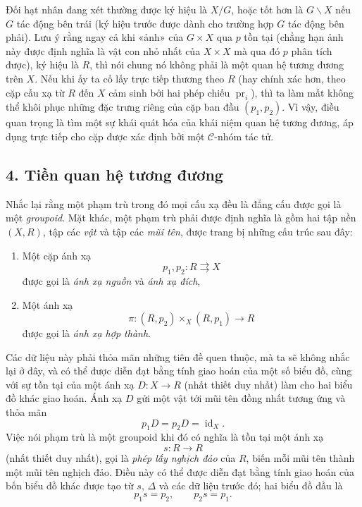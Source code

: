 Đối hạt nhân đang xét thường được ký hiệu là $X/G$, hoặc tốt hơn là
$G\backslash X$ nếu $G$ tác động bên trái (ký hiệu trước được dành cho trường
hợp $G$ tác động bên phải). Lưu ý rằng ngay cả khi «ảnh» của $G\times X$ qua
$p$ tồn tại (chẳng hạn ảnh này được định nghĩa là vật con nhỏ nhất của
$X\times X$ mà qua đó $p$ phân tích được), ký hiệu là $R$, thì nói chung nó
không phải là một quan hệ tương đương trên $X$. Nếu khi ấy ta cố lấy trực tiếp
thương theo $R$ (hay chính xác hơn, theo cặp cấu xạ từ $R$ đến $X$ cảm sinh bởi
hai phép chiếu $\operatorname{pr}_i$), thì ta làm mất không thể khôi phục
những đặc trưng riêng của cặp ban đầu $(p_1,p_2)$. Vì vậy, điều quan trọng là
tìm một sự khái quát hóa của khái niệm quan hệ tương đương, áp dụng trực tiếp
cho cặp được xác định bởi một $\mathcal C$-nhóm tác tử.

\subsection*{4. Tiền quan hệ tương đương}

Nhắc lại rằng một phạm trù trong đó mọi cấu xạ đều là đẳng cấu được gọi là một
\emph{groupoid}. Mặt khác, một phạm trù phải được định nghĩa là gồm hai tập nền
$(X,R)$, tập các \emph{vật} và tập các \emph{mũi tên}, được trang bị những cấu
trúc sau đây:
\begin{enumerate}
\item[(i)] Một cặp ánh xạ
\[
  p_1,p_2:R\rightrightarrows X
\]
được gọi là \emph{ánh xạ nguồn} và \emph{ánh xạ đích},

\item[(ii)] Một ánh xạ
\[
  \pi:(R,p_2)\times_X(R,p_1)\longrightarrow R
\]
được gọi là \emph{ánh xạ hợp thành}.
\end{enumerate}
Các dữ liệu này phải thỏa mãn những tiên đề quen thuộc, mà ta sẽ không nhắc
lại ở đây, và có thể được diễn đạt bằng tính giao hoán của một số biểu đồ,
cùng với sự tồn tại của một ánh xạ $D:X\to R$ (nhất thiết duy nhất) làm cho
hai biểu đồ khác giao hoán. Ánh xạ $D$ gửi một vật tới mũi tên đồng nhất tương ứng
và thỏa mãn
\[
  p_1D=p_2D=\operatorname{id}_X.
\]
Việc nói phạm trù là một groupoid khi đó có nghĩa là tồn tại một ánh xạ
\[
  s:R\longrightarrow R
\]
(nhất thiết duy nhất), gọi là \emph{phép lấy nghịch đảo} của $R$, biến mỗi
mũi tên thành một mũi tên nghịch đảo. Điều này có thể được diễn đạt bằng tính
giao hoán của bốn biểu đồ khác được tạo từ $s$, $\Delta$ và các dữ liệu trước
đó; hai biểu đồ đầu là
\[
  p_1s=p_2,\qquad p_2s=p_1.
\]

